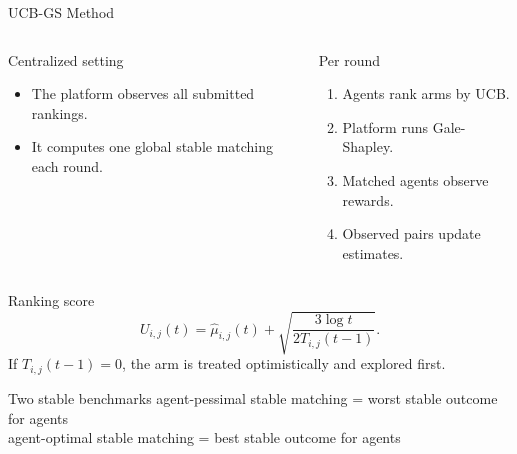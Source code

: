\documentclass[aspectratio=169,11pt]{beamer}
\begin{document}
\begin{frame}{UCB-GS Method}
  \begin{columns}[T,onlytextwidth]
    \begin{block}{Centralized setting}
      \begin{itemize}
        \item The platform observes all submitted rankings.
        \item It computes one global stable matching each round.
      \end{itemize}
    \end{block}

    \begin{block}{Per round}
      \begin{enumerate}
        \item Agents rank arms by UCB.
        \item Platform runs Gale-Shapley.
        \item Matched agents observe rewards.
        \item Observed pairs update estimates.
      \end{enumerate}
    \end{block}
  \end{columns}

  \vspace{0.15cm}
  \begin{block}{Ranking score}
    \[
      U_{i,j}(t)
      =
      \hat{\mu}_{i,j}(t)
      +
      \sqrt{\frac{3\log t}{2T_{i,j}(t-1)}}.
    \]
    \centering
    If $T_{i,j}(t-1)=0$, the arm is treated optimistically and explored first.
  \end{block}

  \vspace{0.1cm}
  \begin{block}{Two stable benchmarks}
    \centering
    agent-pessimal stable matching = worst stable outcome for agents\\[0.08cm]
    agent-optimal stable matching = best stable outcome for agents
  \end{block}
\end{frame}
\end{document}
